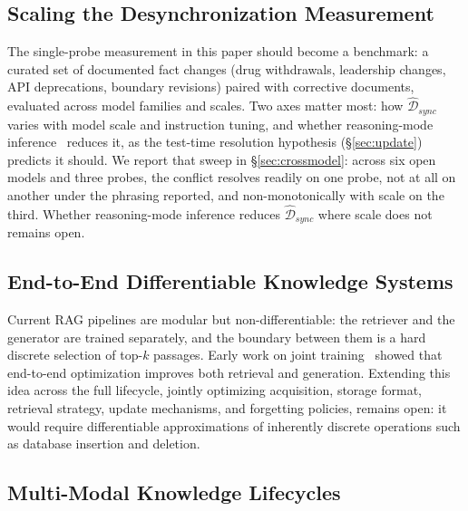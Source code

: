 \documentclass[10pt]{article}
\begin{document}
\subsection{Scaling the Desynchronization Measurement}

The single-probe measurement in this paper should become a benchmark: a curated set of documented fact changes (drug withdrawals, leadership changes, API deprecations, boundary revisions) paired with corrective documents, evaluated across model families and scales. Two axes matter most: how $\widehat{\mathcal{D}}_{sync}$ varies with model scale and instruction tuning, and whether reasoning-mode inference~\citep{openai2024o1, guo2025deepseekr1} reduces it, as the test-time resolution hypothesis (\S\ref{sec:update}) predicts it should. We report that sweep in \S\ref{sec:crossmodel}: across six open models and three probes, the conflict resolves readily on one probe, not at all on another under the phrasing reported, and non-monotonically with scale on the third. Whether reasoning-mode inference reduces $\widehat{\mathcal{D}}_{sync}$ where scale does not remains open.

\subsection{End-to-End Differentiable Knowledge Systems}

Current RAG pipelines are modular but non-differentiable: the retriever and the generator are trained separately, and the boundary between them is a hard discrete selection of top-$k$ passages. Early work on joint training~\citep{guu2020realm, izacard2023atlas} showed that end-to-end optimization improves both retrieval and generation. Extending this idea across the full lifecycle, jointly optimizing acquisition, storage format, retrieval strategy, update mechanisms, and forgetting policies, remains open: it would require differentiable approximations of inherently discrete operations such as database insertion and deletion.

\subsection{Multi-Modal Knowledge Lifecycles}
\end{document}
